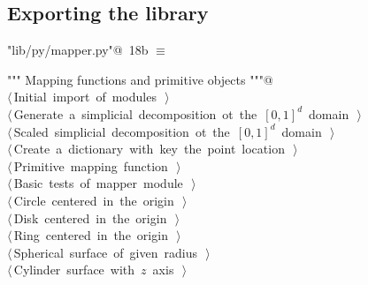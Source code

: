 \documentclass[11pt,oneside]{article}	%
\begin{document}
\subsection{Exporting the library}
\begin{flushleft} \small \label{scrap34}
\protect{}\verb@"lib/py/mapper.py"@\nobreak\ {\footnotesize 18b }$\equiv$
\vspace{-1ex}
\begin{list}{}{} \item
\mbox{}\verb@""" Mapping functions and primitive objects """@\\
\mbox{}\verb@@\hbox{$\langle\,$Initial import of modules\nobreak\ {\footnotesize {}}$\,\rangle$}\verb@@\\
\mbox{}\verb@@\hbox{$\langle\,$Generate a simplicial decomposition ot the $[0,1]^d$ domain\nobreak\ {\footnotesize {}}$\,\rangle$}\verb@@\\
\mbox{}\verb@@\hbox{$\langle\,$Scaled simplicial decomposition ot the $[0,1]^d$ domain\nobreak\ {\footnotesize {}}$\,\rangle$}\verb@@\\
\mbox{}\verb@@\hbox{$\langle\,$Create a dictionary with key the point location\nobreak\ {\footnotesize {}}$\,\rangle$}\verb@@\\
\mbox{}\verb@@\hbox{$\langle\,$Primitive mapping function\nobreak\ {\footnotesize {}}$\,\rangle$}\verb@@\\
\mbox{}\verb@@\hbox{$\langle\,$Basic tests of mapper module\nobreak\ {\footnotesize {}}$\,\rangle$}\verb@@\\
\mbox{}\verb@@\hbox{$\langle\,$Circle centered in the origin\nobreak\ {\footnotesize {}}$\,\rangle$}\verb@@\\
\mbox{}\verb@@\hbox{$\langle\,$Disk centered in the origin\nobreak\ {\footnotesize {}}$\,\rangle$}\verb@@\\
\mbox{}\verb@@\hbox{$\langle\,$Ring centered in the origin\nobreak\ {\footnotesize {}}$\,\rangle$}\verb@@\\
\mbox{}\verb@@\hbox{$\langle\,$Spherical surface of given radius\nobreak\ {\footnotesize {}}$\,\rangle$}\verb@@\\
\mbox{}\verb@@\hbox{$\langle\,$Cylinder surface with $z$ axis\nobreak\ {\footnotesize {}}$\,\rangle$}\verb@@\\

\end{list}
\end{flushleft}
\end{document}
